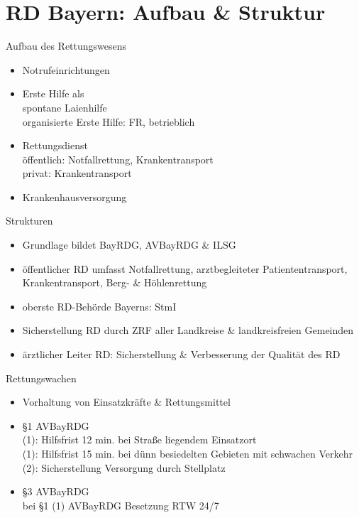 \section{RD Bayern: Aufbau \& Struktur}
\begin{sectionbox}{Aufbau des Rettungswesens}
    \begin{itemize}
        \item Notrufeinrichtungen
        \item Erste Hilfe als\\
        \ra spontane Laienhilfe\\
        \ra organisierte Erste Hilfe: FR, betrieblich
        \item Rettungsdienst\\
        \ra öffentlich: Notfallrettung, Krankentransport\\
        \ra privat: Krankentransport
        \item Krankenhausversorgung
    \end{itemize}
\end{sectionbox}
\begin{sectionbox}{Strukturen}
    \begin{itemize}
        \item Grundlage bildet BayRDG, AVBayRDG \& ILSG
        \item öffentlicher RD umfasst Notfallrettung, arztbegleiteter Patiententransport, Krankentransport, Berg- \& Höhlenrettung
        \item oberste RD-Behörde Bayerns: StmI
        \item Sicherstellung RD durch ZRF aller Landkreise \& landkreisfreien Gemeinden
        \item ärztlicher Leiter RD: Sicherstellung \& Verbesserung der Qualität des RD
    \end{itemize}
\end{sectionbox}
\begin{sectionbox}{Rettungswachen}
    \begin{itemize}
        \item Vorhaltung von Einsatzkräfte \& Rettungsmittel
        \item §1 AVBayRDG\\
        \ra (1): Hilfsfrist 12 min. bei Straße liegendem Einsatzort\\
        \ra (1): Hilfsfrist 15 min. bei dünn besiedelten Gebieten mit schwachen Verkehr\\
        \ra (2): Sicherstellung Versorgung durch Stellplatz
        \item §3 AVBayRDG\\
        \ra bei §1 (1) AVBayRDG Besetzung RTW 24/7
    \end{itemize}
\end{sectionbox}